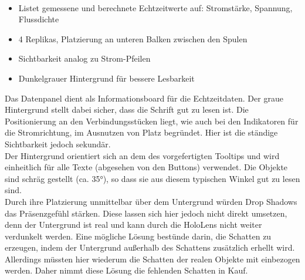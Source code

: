 \vspace{8px}
\begin{center}
	\\
\end{center}
\vspace{6px}

\begin{itemize}[rightmargin=12px, topsep=-12px]
	\setlength{\itemsep}{-1pt}
	\singlespacing
	\item Listet gemessene und berechnete Echtzeitwerte auf: Stromstärke, Spannung, Flussdichte
	\item 4 Replikas, Platzierung an unteren Balken zwischen den Spulen
	\item Sichtbarkeit analog zu Strom-Pfeilen
	\item Dunkelgrauer Hintergrund für bessere Lesbarkeit
\end{itemize}

Das Datenpanel dient als Informationsboard für die Echtzeitdaten. Der graue Hintergrund stellt dabei sicher, dass die Schrift gut zu lesen ist. Die Positionierung an den Verbindungsstücken liegt, wie auch bei den Indikatoren für die Stromrichtung, im Ausnutzen von Platz begründet. Hier ist die ständige Sichtbarkeit jedoch sekundär.\\

Der Hintergrund orientiert sich an dem des vorgefertigten Tooltips und wird einheitlich für alle Texte (abgesehen von den Buttons) verwendet. Die Objekte sind schräg gestellt (ca. 35°), so dass sie aus diesem typischen Winkel gut zu lesen sind.\\

Durch ihre Platzierung unmittelbar über dem Untergrund würden Drop Shadows das Präsenzgefühl stärken. Diese lassen sich hier jedoch nicht direkt umsetzen, denn der Untergrund ist real und kann durch die HoloLens nicht weiter verdunkelt werden. Eine mögliche Lösung bestünde darin, die Schatten zu erzeugen, indem der Untergrund außerhalb des Schattens zusätzlich erhellt wird. Allerdings müssten hier wiederum die Schatten der realen Objekte mit einbezogen werden. Daher nimmt diese Lösung die fehlenden Schatten in Kauf.\\

